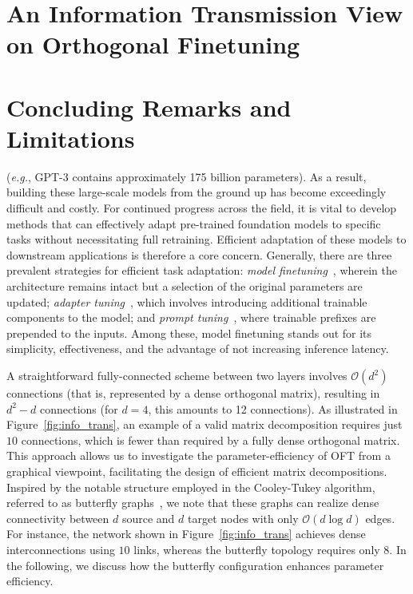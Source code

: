 \section{An Information Transmission View on Orthogonal Finetuning}

\section{Concluding Remarks and Limitations}

(\emph{e.g.}, GPT-3 contains approximately 175 billion parameters). As a result, building these large-scale models from the ground up has become exceedingly difficult and costly. For continued progress across the field, it is vital to develop methods that can effectively adapt pre-trained foundation models to specific tasks without necessitating full retraining. Efficient adaptation of these models to downstream applications is therefore a core concern. Generally, there are three prevalent strategies for efficient task adaptation: \emph{model finetuning}~\cite{hulora2022,zaken2022bitfit,guo2020parameter,raffel2020exploring,qiu2023controlling,zhang2022adaptive,chavan2023one}, wherein the architecture remains intact but a selection of the original parameters are updated; \emph{adapter tuning}~\cite{rebuffi2017learning,houlsby2019parameter,pfeiffer2020adapterfusion,lin2020exploring,he2021towards}, which involves introducing additional trainable components to the model; and \emph{prompt tuning}~\cite{li2021prefix,lester2021power}, where trainable prefixes are prepended to the inputs. Among these, model finetuning stands out for its simplicity, effectiveness, and the advantage of not increasing inference latency.

A straightforward fully-connected scheme between two layers involves $\mathcal{O}(d^2)$ connections (that is, represented by a dense orthogonal matrix), resulting in $d^2-d$ connections (for $d=4$, this amounts to 12 connections). As illustrated in Figure~\ref{fig:info_trans}, an example of a valid matrix decomposition requires just $10$ connections, which is fewer than required by a fully dense orthogonal matrix. This approach allows us to investigate the parameter-efficiency of OFT from a graphical viewpoint, facilitating the design of efficient matrix decompositions. Inspired by the notable structure employed in the Cooley-Tukey algorithm, referred to as butterfly graphs~\cite{cooley1965algorithm}, we note that these graphs can realize dense connectivity between $d$ source and $d$ target nodes with only $\mathcal{O}(d\log d)$ edges. For instance, the network shown in Figure~\ref{fig:info_trans} achieves dense interconnections using $10$ links, whereas the butterfly topology requires only $8$. In the following, we discuss how the butterfly configuration enhances parameter efficiency.

